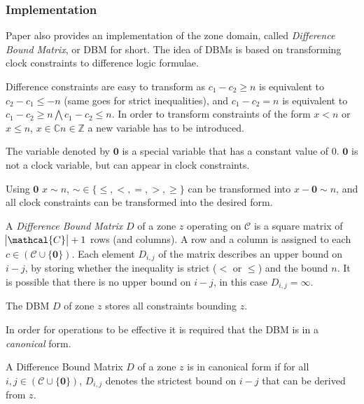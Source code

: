 \subsubsection{Implementation}

Paper \cite{bengtsson2004timed} also provides an implementation of the zone domain, called \emph{Difference Bound Matrix}, or DBM for short. The idea of DBMs is based on transforming clock constraints to difference logic formulae.

Difference constraints are easy to transform as $c_1 - c_2 \geq n$ is equivalent to $c_2 - c_1 \leq -n$ (same goes for strict inequalities), and $c_1 - c_2 = n$ is equivalent to $c_1 - c_2 \geq n \bigwedge c_1 - c_2 \leq n$. In order to transform constraints of the form $x<n$ or$x \leq n$, $x \in \mathbb{C} n \in \mathds{Z}$ a new variable has to be introduced.

\begin{dfn}
	The variable denoted by $\textbf{0}$ is a special variable that has a constant value of 0. $\textbf{0}$ is not a clock variable, but can appear in clock constraints.
\end{dfn}

Using $\textbf{0}$ $x \sim n$,  $\sim \in \{\leq,<,=,>,\geq\}$ can be transformed into $x- \textbf{0} \sim n$, and all clock constraints can be transformed into the desired form. 


\begin{dfn}
	A \emph{Difference Bound Matrix} $D$ of a zone $z$ operating on $\mathcal{C}$ is a square matrix of $\abs{\mathcal{C}}+1$ rows (and columns). A row and a column is assigned to each $c \in (\mathcal{C} \cup \{\textbf{0}\})$. Each element $D_{i,j}$ of the matrix describes an upper bound on $i - j$, by storing whether the inequality is strict ($<$ or $\leq$) and the bound $n$. It is possible that there is no upper bound on $i-j$, in this case $D_{i,j}=\infty$.
	
	The DBM $D$ of zone $z$ stores all constraints bounding $z$.
\end{dfn}

In order for operations to be effective it is required that the DBM is in a \emph{canonical} form.

\begin{dfn}
	A Difference Bound Matrix $D$ of a zone $z$ is in canonical form if for all $i,j \in (\mathcal{C} \cup \{\textbf{0}\})$, $D_{i,j}$ denotes the strictest bound on $i-j$ that can be derived from $z$.
\end{dfn}

